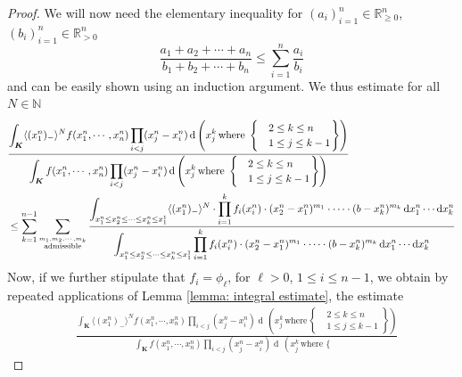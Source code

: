 \documentclass[11pt, reqno]{amsart}
\numberwithin{equation}{section}
\newcommand{\N}{\ensuremath{\mathbb{N}}}
\newcommand{\R}{\ensuremath{\mathbb{R}}}
\newcommand{\diff}{\ensuremath{\operatorname{d}\!}}
\begin{document}
\begin{proof}
We will now need the elementary inequality for $(a_i)_{i=1}^n\in \R^n_{\ge 0}$, $(b_i)_{i=1}^n\in \R^n_{> 0}$
\begin{equation*}
    \frac{a_1+a_2+\cdots + a_n}{b_1+b_2+\cdots + b_n}\le \displaystyle\sum_{i=1}^n \frac{a_i}{b_i}
\end{equation*}
and can be easily shown using an induction argument. We thus estimate for all $N\in \N$
\begin{align*}
     & \frac{\displaystyle\int_{\boldsymbol{K}}\langle (x^n_1)_-\rangle ^N f (x^n_1, \cdots, x^n_n)\displaystyle\prod_{i<j} (x^n_j-x^n_i) \diff\, \left(x^k_j\, \mathrm{where}\, \left.\begin{cases}
       &2\le k \le n\\
       &1\le j \le k-1
   \end{cases}\right\} \right)}{\displaystyle\int_{\boldsymbol{K}}f (x^n_1, \cdots, x^n_n)\displaystyle\prod_{i<j} (x^n_j-x^n_i) \diff\, \left(x^k_j\, \mathrm{where}\, \left.\begin{cases}
       &2\le k \le n\\
       &1\le j \le k-1
   \end{cases}\right\} \right)} \\
     & \le \displaystyle \displaystyle \sum_{k=1}^{n-1}\sum_{\stackrel{m_1, m_2, \cdots, m_k}{\mathrm{admissible}}}\displaystyle\frac{\displaystyle\int_{x^n_1\le x^n_2\le \cdots\le x^n_k\le x^1_1}\langle (x^n_1)_-\rangle ^N \cdot \prod_{i=1}^{k}f_i(x^n_i)\cdot(x^n_2-x^n_1)^{m_1}\cdot \cdots \cdot (b-x^n_k)^{m_k}\diff x^n_1\cdots \diff x^n_{k}}{\displaystyle\int_{x^n_1\le x^n_2\le \cdots\le x^n_k\le x^1_1}\prod_{i=1}^{k}f_i(x^n_i)\cdot(x^n_2-x^n_1)^{m_1}\cdot \cdots \cdot (b-x^n_k)^{m_k}\diff x^n_1\cdots \diff x^n_{k}}
\end{align*}
Now, if we further stipulate that $f_i = \phi_{\ell}$, for $\ell>0$, $1\le i \le n-1$, we obtain
by repeated applications of Lemma \ref{lemma: integral estimate}, the estimate
\begin{equation*}
\begin{array}{cc}
     & \frac{\displaystyle\int_{\boldsymbol{K}}\langle (x^n_1)_-\rangle ^N f (x^n_1, \cdots, x^n_n)\displaystyle\prod_{i<j} (x^n_j-x^n_i) \diff\, \left(x^k_j\, \mathrm{where}\, \left.\begin{cases}
       &2\le k \le n\\
       &1\le j \le k-1
   \end{cases}\right\} \right)}{\displaystyle\int_{\boldsymbol{K}}f (x^n_1, \cdots, x^n_n)\displaystyle\prod_{i<j} (x^n_j-x^n_i) \diff\, \left(x^k_j\, \mathrm{where}\, \left.\begin{cases}

\end{cases}}
\end{array}
\end{equation*}
\end{proof}
\end{document}
